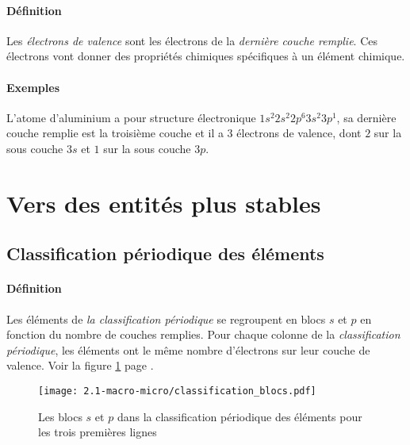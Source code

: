 \paragraph{Définition} Les \textit{électrons de valence} sont les électrons de la
\textit{dernière couche remplie}. Ces électrons vont donner des propriétés 
chimiques spécifiques à un élément chimique.

\paragraph{Exemples} L'atome d'aluminium a pour structure électronique $1s^2 2s^2 2p^6 3s^2 3p^1$,
sa dernière couche remplie est la troisième couche et il a $3$ électrons de valence, dont $2$ sur 
la sous couche $3s$ et $1$ sur la sous couche $3p$.


\section{Vers des entités plus stables}

\subsection{Classification périodique des éléments}

\paragraph{Définition} Les éléments de \textit{la classification périodique} se regroupent
en blocs $s$ et $p$ en fonction du nombre de couches remplies. Pour chaque colonne de 
la \textit{classification périodique}, les éléments ont le même nombre d'électrons sur leur
couche de valence. Voir la figure \ref{fig:bloc_s_p} page \pageref{fig:bloc_s_p}.
\begin{figure}[!h]
    \begin{center}
	\texttt{[image: 2.1-macro-micro/classification\_blocs.pdf]}
    \end{center}
    \caption{Les blocs $s$ et $p$ dans la classification périodique des éléments pour
    les trois premières lignes}
    \label{fig:bloc_s_p}
\end{figure}

